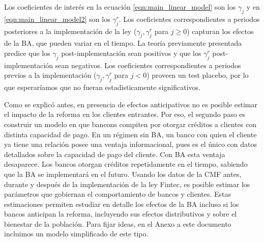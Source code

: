\documentclass[11pt]{article}
\theoremstyle{plain}
\theoremstyle{plain}
\begin{document}
 
Los coeficientes de interés en la ecuación \ref{eqn:main_linear_model} son los $\gamma_j$ y en \ref{eqn:main_linear_model2} son los $\gamma_j^r$. Los coeficientes correspondientes a periodos posteriores a la implementación de la ley ($\gamma_j,  \gamma_j^r$ para $j \geq 0$) capturan los efectos de la BA, que pueden variar en el tiempo. La teoría previamente presentada predice que los $\gamma_j$ post-implementación sean positivos y que los $\gamma_j^r$ post-implementación sean negativos. Los coeficientes correspondientes a periodos previos a la implementación ($\gamma_j,  \gamma_j^r$ para $j < 0$) proveen un test placebo, por lo que esperaríamos que no fueran estadisticamente significativos. 




 

Como se explicó antes, en presencia de efectos anticipativos no es posible estimar el impacto de la reforma en los clientes entrantes. 
Por eso, el segundo paso es construir un modelo en que bancons compiten por otorgar créditos a clientes con distinta capacidad de pago. En un régimen sin BA, un banco con quien el cliente ya tiene una relación posee una ventaja informacional, pues es el único con datos detallados sobre la capacidad de pago del cliente. Con BA esta ventaja desaparece. Los bancos otorgan créditos repetidamente en el tiempo, sabiendo que la BA se implementará en el futuro. Usando los datos de la CMF antes, durante y después de la implementación de la ley Fintec, es posible estimar los parámetros que gobiernan el comportamiento de bancos y clientes. Estas estimaciones permiten estudiar en detalle los efectos de la BA incluso si los bancos anticipan la reforma, incluyendo sus efectos distributivos y sobre el bienestar de la población. Para fijar ideas, en el Anexo a este documento incluimos un modelo simplificado de este tipo.

 
\end{document}
